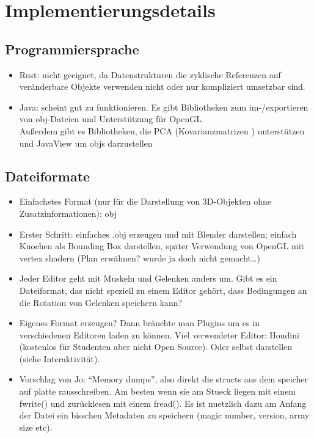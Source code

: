 \chapter{Implementierungsdetails}
\label{chapter:implementation_detail}

\section{Programmiersprache}
\label{programming_language}

\begin{itemize}
 \item Rust: nicht geeignet, da Datenstrukturen die zyklische Referenzen auf veränderbare Objekte verwenden nicht oder nur kompliziert umsetzbar sind.
 \item Java: scheint gut zu funktionieren. Es gibt Bibliotheken zum im-/exportieren von obj-Dateien und Unterstützung für OpenGL\\
 Außerdem gibt es Bibliotheken, die PCA (\bzw Kovarianzmatrizen \etc) unterstützen und JavaView um objs darzustellen
\end{itemize}


\section{Dateiformate}

\begin{itemize}
 \item Einfachstes Format (nur für die Darstellung von 3D-Objekten ohne Zusatzinformationen): obj
 \item Erster Schritt: einfaches .obj erzeugen und mit Blender darstellen; einfach Knochen als Bounding Box darstellen, später Verwendung von OpenGL mit vertex shadern \etc (Plan erwähnen? wurde ja doch nicht gemacht\dots)
 \item Jeder Editor geht mit Muskeln und Gelenken anders um. Gibt es ein Dateiformat, das nicht speziell zu einem Editor gehört, dass Bedingungen an die Rotation von Gelenken speichern kann?
 \item Eigenes Format erzeugen? Dann bräuchte man Plugins um es in verschiedenen Editoren laden zu können. Viel verwendeter Editor: Houdini (kostenlos für Studenten aber nicht Open Source). Oder selbst darstellen (siehe Interaktivität).
\item Vorschlag von Jo: "`Memory dumps"', also direkt die structs aus dem speicher auf platte rausschreiben. Am besten wenn sie am Stueck liegen mit einem fwrite() und zurücklesen mit einem fread(). Es ist nuetzlich dazu am Anfang der Datei ein bisschen Metadaten zu speichern (magic number, version, array size etc).
\end{itemize}

